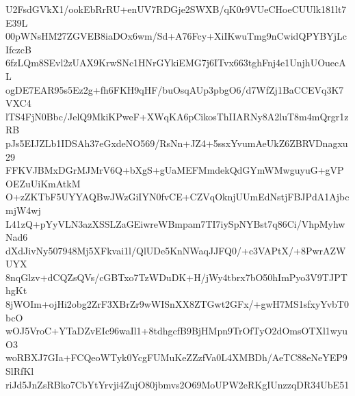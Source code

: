U2FsdGVkX1/ookEbRrRU+enUV7RDGje2SWXB/qK0r9VUeCHoeCUUlk181lt7E39L
00pWNsHM27ZGVEB8iaDOx6wm/Sd+A76Fcy+XiIKwuTmg9nCwidQPYBYjLcIfczcB
6fzLQm8SEvl2zUAX9KrwSNc1HNrGYkiEMG7j6ITvx663tghFnj4e1UnjhUOuecAL
ogDE7EAR95s5Ez2g+fh6FKH9qHF/buOsqAUp3pbgO6/d7WfZj1BaCCEVq3K7VXC4
lTS4FjN0Bbc/JelQ9MkiKPweF+XWqKA6pCikosThIIARNy8A2luT8m4mQrgr1zRB
pJs5EIJZLb1IDSAh37eGxdeNO569/RsNn+JZ4+5ssxYvumAeUkZ6ZBRVDnagxu29
FFKVJBMxDGrMJMrV6Q+bXgS+gUaMEFMmdekQdGYmWMwguyuG+gVPOEZuUiKmAtkM
O+zZKTbF5UYYAQBwJWzGiIYN0fvCE+CZVqOknjUUmEdNstjFBJPdA1AjbcmjW4wj
L41zQ+pYyVLN3azXSSLZaGEiwreWBmpam7TI7iySpNYBst7q86Ci/VhpMyhwNad6
dXdJivNy507948Mj5XFkvai1l/QlUDe5KnNWaqJJFQ0/+c3VAPtX/+8PwrAZWUYX
8nqGlzv+dCQZsQVs/cGBTxo7TzWDuDK+H/jWy4tbrx7bO50hImPyo3V9TJPThgKt
8jWOIm+ojHi2obg2ZrF3XBrZr9wWISnXX8ZTGwt2GFx/+gwH7MS1sfxyYvbT0bcO
wOJ5VroC+YTaDZvEIc96waIl1+8tdhgcfB9BjHMpn9TrOfTyO2dOmsOTXl1wyuO3
woRBXJ7GIa+FCQeoWTyk0YcgFUMuKeZZzfVa0L4XMBDh/AeTC88eNeYEP9SlRfKl
riJd5JnZsRBko7CbYtYrvji4ZujO80jbmvs2O69MoUPW2eRKgIUnzzqDR34UbE51
